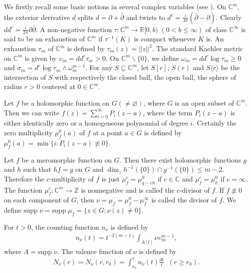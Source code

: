 \documentclass[11pt, reqno]{amsart}
\newcommand{\ol}{\overline}
\numberwithin{equation}{section}
\begin{document}
We firstly recall some basic notions in several complex variables (see \cite{HLY,Noguchi-Winkelmann,WS}).
On $\mathbb{C}^m$, the exterior derivative $d$ splits $d= \partial+ \bar{\partial}$ and twists to $d^c= \frac{\iota}{4\pi}\left(\bar{\partial}- \partial\right)$. Clearly $dd^{c}= \frac{\iota}{2\pi}\partial\bar{\partial}$. A non-negative function $\tau: \mathbb{C}^m\to \mathbb{R}[0,b)\;(0<b\leq \infty)$ of class $\mathbb{C}^{\infty}$ is said to be an exhaustion of $\mathbb{C}^m$ if $\tau^{-1}(K)$ is compact whenever $K$ is. 
An exhaustion $\tau_m$ of $\mathbb{C}^m$ is defined by $\tau_m(z)=||z||^2$. The standard Kaehler metric on $\mathbb{C}^m$ is given by $\upsilon_m=dd^c\tau_m>0$. On $\mathbb{C}^m\backslash \{0\}$, we define $\omega_m=dd^c\log \tau_m\geq 0$ and $\sigma_m=d^c\log \tau_m \wedge \omega_m^{m-1}$. For any $S\subseteq \mathbb{C}^m$, let $S[r]$, $S(r)$ and $S\langle r\rangle$ be the intersection of $S$ with respectively the closed ball, the open ball, the sphere of radius $r>0$ centered at $0\in \mathbb{C}^m$.

\smallskip
Let $f$ be a holomorphic function on $G(\not=\varnothing)$, where $G$ is an open subset of $\mathbb{C}^m$. Then we can write $f(z)=\sum_{i=0}^{\infty}P_i(z-a)$, where the term $P_i(z-a)$ is either identically zero or a homogeneous polynomial of degree $i$. Certainly the zero multiplicity $\mu^0_f(a)$ of $f$ at a point $a\in G$ is defined by $\mu^0_f(a)=\min\{i:P_i(z-a)\not\equiv 0\}$.

\medskip
Let $f$ be a meromorphic function on $G$. Then there exist holomorphic functions $g$ and $h$ such that $hf=g$ on $G$ and $\dim_z h^{-1}(\{0\})\cap g^{-1}(\{0\})\leq m-2$. Therefore the $c$-multiplicity of $f$ is just $\mu^c_f=\mu^0_{g-ch}$ if $c\in\mathbb{C}$ and $\mu^c_f=\mu^0_h$ if $c=\infty$. The function $\mu^c_f: \mathbb{C}^m\to \mathbb{Z}$ is nonnegative and is called the $c$-divisor of $f$. If $f\not\equiv 0$ on each component of $G$, then $\nu=\mu_f=\mu^0_f-\mu^{\infty}_f$ is called the divisor of $f$. We define 
$\text{supp}\; \nu=\text{supp}\;\mu_f=\ol{\{z\in G: \nu(z)\neq 0\}}$.

For $t>0$, the counting function $n_{\nu}$ is defined by
\begin{align*}
 n_{\nu}(t)=t^{-2(m-1)}\int_{A[t]}\nu \upsilon_m^{m-1},
 \end{align*}
where $A=\text{supp}\;\nu$. The valence function of $\nu$ is defined by 
\begin{align*}
N_{\nu}(r)=N_{\nu}(r,r_0)=\int_{r_0}^r n_{\nu}(t)\frac{dt}{t}\;\;(r\geq r_0).
\end{align*}
\end{document}

